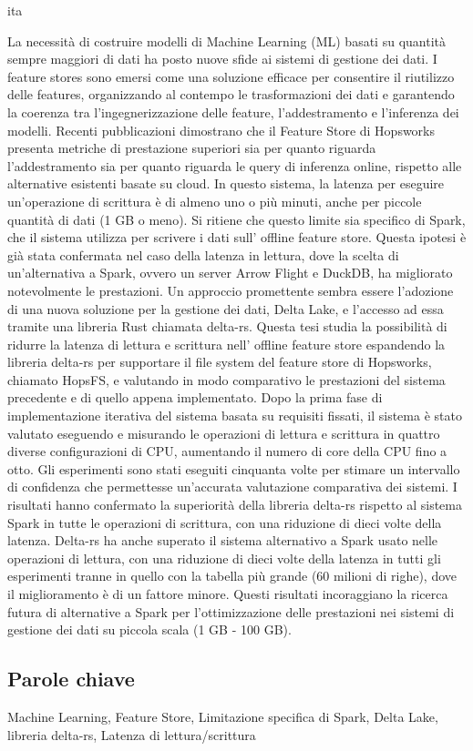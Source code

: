 \markboth{\abstractname}{}
\begin{scontents}[store-env=lang]
ita
\end{scontents}
\begin{scontents}[store-env=abstracts,print-env=true]
La necessità di costruire modelli di Machine Learning (ML) basati su quantità sempre maggiori di dati ha posto nuove sfide ai sistemi di gestione dei dati. I feature stores sono emersi come una soluzione efficace per consentire il riutilizzo delle features, organizzando al contempo le trasformazioni dei dati e garantendo la coerenza tra l'ingegnerizzazione delle feature, l'addestramento e l'inferenza dei modelli. Recenti pubblicazioni dimostrano che il Feature Store di Hopsworks presenta metriche di prestazione superiori sia per quanto riguarda l'addestramento sia per quanto riguarda le query di inferenza online, rispetto alle alternative esistenti basate su cloud. In questo sistema, la latenza per eseguire un'operazione di scrittura è di almeno uno o più minuti, anche per piccole quantità di dati (1 GB o meno). Si ritiene che questo limite sia specifico di Spark, che il sistema utilizza per scrivere i dati sull' offline feature store. Questa ipotesi è già stata confermata nel caso della latenza in lettura, dove la scelta di un'alternativa a Spark, ovvero un server Arrow Flight e DuckDB, ha migliorato notevolmente le prestazioni. Un approccio promettente sembra essere l'adozione di una nuova soluzione per la gestione dei dati, Delta Lake, e l'accesso ad essa tramite una libreria Rust chiamata delta-rs. Questa tesi studia la possibilità di ridurre la latenza di lettura e scrittura nell' offline feature store  espandendo la libreria delta-rs per supportare il file system del feature store di Hopsworks, chiamato HopsFS, e valutando in modo comparativo le prestazioni del sistema precedente e di quello appena implementato. Dopo la prima fase di implementazione iterativa del sistema basata su requisiti fissati, il sistema è stato valutato eseguendo e misurando le operazioni di lettura e scrittura in quattro diverse configurazioni di CPU, aumentando il numero di core della CPU fino a otto. Gli esperimenti sono stati eseguiti cinquanta volte per stimare un intervallo di confidenza che permettesse un'accurata valutazione comparativa dei sistemi. I risultati hanno confermato la superiorità della libreria delta-rs rispetto al sistema Spark in tutte le operazioni di scrittura, con una riduzione di dieci volte della latenza. Delta-rs ha anche superato il sistema alternativo a Spark usato nelle operazioni di lettura, con una riduzione di dieci volte della latenza in tutti gli esperimenti tranne in quello con la tabella più grande (60 milioni di righe), dove il miglioramento è di un fattore minore. Questi risultati incoraggiano la ricerca futura di alternative a Spark per l'ottimizzazione delle prestazioni nei sistemi di gestione dei dati su piccola scala (1 GB - 100 GB).
\end{scontents}
\subsection*{Parole chiave}
\begin{scontents}[store-env=keywords,print-env=true]
Machine Learning, Feature Store, Limitazione specifica di Spark, Delta Lake, libreria delta-rs, Latenza di lettura/scrittura
\end{scontents}